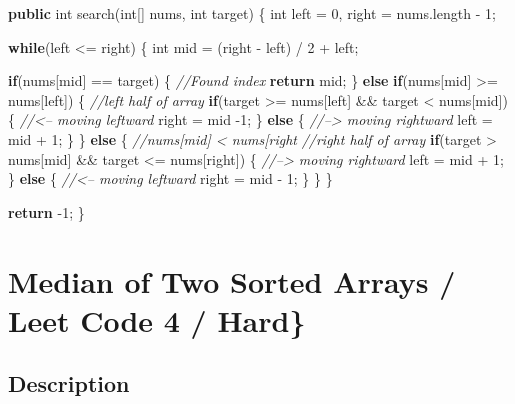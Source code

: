 \documentclass[]{book}
\newenvironment{Shaded}{\begin{snugshade}}{\end{snugshade}}
\newcommand{\CommentTok}[1]{\textcolor[rgb]{0.56,0.35,0.01}{\textit{#1}}}
\newcommand{\DataTypeTok}[1]{\textcolor[rgb]{0.13,0.29,0.53}{#1}}
\newcommand{\DecValTok}[1]{\textcolor[rgb]{0.00,0.00,0.81}{#1}}
\newcommand{\FunctionTok}[1]{\textcolor[rgb]{0.00,0.00,0.00}{#1}}
\newcommand{\KeywordTok}[1]{\textcolor[rgb]{0.13,0.29,0.53}{\textbf{#1}}}
\newcommand{\NormalTok}[1]{#1}
\begin{document}
\begin{Shaded}
\begin{Highlighting}[]
\KeywordTok{public} \DataTypeTok{int} \FunctionTok{search}\NormalTok{(}\DataTypeTok{int}\NormalTok{[] nums, }\DataTypeTok{int}\NormalTok{ target) \{}
    \DataTypeTok{int}\NormalTok{ left = }\DecValTok{0}\NormalTok{, right = nums.}\FunctionTok{length}\NormalTok{ - }\DecValTok{1}\NormalTok{;}

    \KeywordTok{while}\NormalTok{(left <= right) \{}
        \DataTypeTok{int}\NormalTok{ mid = (right - left) / }\DecValTok{2}\NormalTok{ + left;}

        \KeywordTok{if}\NormalTok{(nums[mid] == target) \{}
            \CommentTok{//Found index}
            \KeywordTok{return}\NormalTok{ mid;}
\NormalTok{        \} }\KeywordTok{else} \KeywordTok{if}\NormalTok{(nums[mid] >= nums[left]) \{}
            \CommentTok{//left half of array}
            \KeywordTok{if}\NormalTok{(target >= nums[left] && target < nums[mid]) \{}
                \CommentTok{//<-- moving leftward}
\NormalTok{                right = mid }\DecValTok{-1}\NormalTok{;}
\NormalTok{            \} }\KeywordTok{else}\NormalTok{ \{}
                \CommentTok{//--> moving rightward}
\NormalTok{                left = mid + }\DecValTok{1}\NormalTok{;}
\NormalTok{            \}}
\NormalTok{        \} }\KeywordTok{else}\NormalTok{ \{}
            \CommentTok{//nums[mid] < nums[right}
            \CommentTok{//right half of array}
            \KeywordTok{if}\NormalTok{(target > nums[mid] && target <= nums[right]) \{}
                \CommentTok{//--> moving rightward}
\NormalTok{                left = mid + }\DecValTok{1}\NormalTok{;}
\NormalTok{            \} }\KeywordTok{else}\NormalTok{ \{}
                \CommentTok{//<-- moving leftward}
\NormalTok{                right = mid - }\DecValTok{1}\NormalTok{;}
\NormalTok{            \}}
\NormalTok{        \}}
\NormalTok{    \}}

    \KeywordTok{return} \DecValTok{-1}\NormalTok{;}
\NormalTok{\}}
\end{Highlighting}
\end{Shaded}

\hypertarget{median-of-two-sorted-arrays-leet-code-4-hard}{%
\section{Median of Two Sorted Arrays / Leet Code 4 / Hard\}}\label{median-of-two-sorted-arrays-leet-code-4-hard}}

\hypertarget{description-11}{%
\subsection{Description}\label{description-11}}
\end{document}
